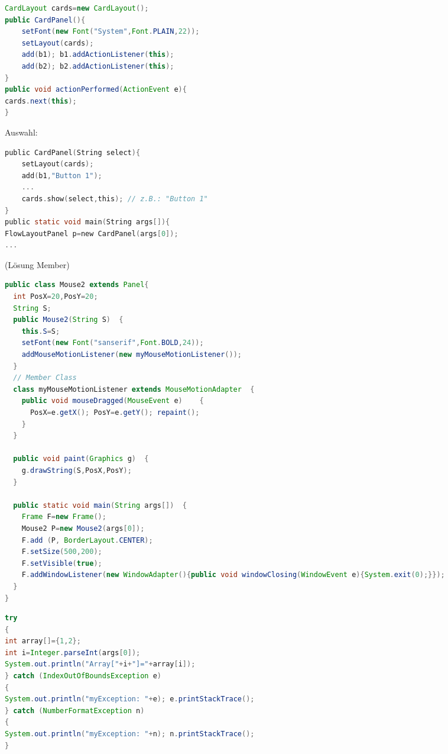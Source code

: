 \begin{multicols*}{3}
\begin{lstlisting}[language=Java]
CardLayout cards=new CardLayout();
public CardPanel(){
	setFont(new Font("System",Font.PLAIN,22));
	setLayout(cards);
	add(b1); b1.addActionListener(this);
	add(b2); b2.addActionListener(this);
}
public void actionPerformed(ActionEvent e){
cards.next(this);
}
\end{lstlisting}
Auswahl:
\begin{lstlisting}[language=C]
public CardPanel(String select){
	setLayout(cards);
	add(b1,"Button 1");
	...
	cards.show(select,this); // z.B.: "Button 1"
}
public static void main(String args[]){
FlowLayoutPanel p=new CardPanel(args[0]);
...
\end{lstlisting}
 (Lösung Member)
\begin{lstlisting}[language=Java]
public class Mouse2 extends Panel{
  int PosX=20,PosY=20;
  String S;
  public Mouse2(String S)  {
    this.S=S;
    setFont(new Font("sanserif",Font.BOLD,24));   
    addMouseMotionListener(new myMouseMotionListener());
  }
  // Member Class
  class myMouseMotionListener extends MouseMotionAdapter  {
    public void mouseDragged(MouseEvent e)    {
      PosX=e.getX(); PosY=e.getY(); repaint();
    }
  }

  public void paint(Graphics g)  {
    g.drawString(S,PosX,PosY);
  }

  public static void main(String args[])  {
    Frame F=new Frame();
    Mouse2 P=new Mouse2(args[0]);
    F.add (P, BorderLayout.CENTER);
    F.setSize(500,200);
    F.setVisible(true);
    F.addWindowListener(new WindowAdapter(){public void windowClosing(WindowEvent e){System.exit(0);}});
  }
}
\end{lstlisting}
\begin{lstlisting}[language=Java]
try
{
int array[]={1,2};
int i=Integer.parseInt(args[0]);
System.out.println("Array["+i+"]="+array[i]);
} catch (IndexOutOfBoundsException e)
{
System.out.println("myException: "+e); e.printStackTrace();
} catch (NumberFormatException n)
{
System.out.println("myException: "+n); n.printStackTrace();
}
\end{lstlisting}

\end{multicols*}

